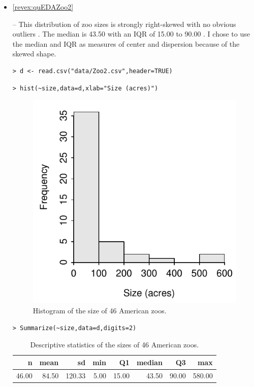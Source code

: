 \documentclass[10pt,openany]{book}\usepackage[]{graphicx}\usepackage[]{color}
\makeatletter
\newenvironment{kframe}{%
 \def\at@end@of@kframe{}%
 \ifinner\ifhmode%
  \def\at@end@of@kframe{\end{minipage}}%
  \begin{minipage}{\columnwidth}%
 \fi\fi%
 \def\FrameCommand##1{\hskip\@totalleftmargin \hskip-\fboxsep
 \colorbox{shadecolor}{##1}\hskip-\fboxsep
     \hskip-\linewidth \hskip-\@totalleftmargin \hskip\columnwidth}%
 \MakeFramed {\advance\hsize-\width
   \@totalleftmargin\z@ \linewidth\hsize
   \@setminipage}}%
 {\par\unskip\endMakeFramed%
 \at@end@of@kframe}
\newenvironment{knitrout}{}{} %
\makeatother
\begin{document}
\begin{itemize}
  \item \hypertarget{ans:quEDAZoo2}{\ref{revex:quEDAZoo2}} -- This distribution of zoo sizes is strongly right-skewed with no obvious outliers .  The median is 43.50 with an IQR of 15.00 to 90.00 .  I chose to use the median and IQR as measures of center and dispersion because of the skewed shape.
\begin{knitrout}
\color{fgcolor}\begin{kframe}
\begin{verbatim}
> d <- read.csv("data/Zoo2.csv",header=TRUE)
\end{verbatim}
\end{kframe}
\end{knitrout}
\begin{knitrout}
\color{fgcolor}\begin{kframe}
\begin{verbatim}
> hist(~size,data=d,xlab="Size (acres)")
\end{verbatim}
\end{kframe}\begin{figure}[hbtp]

{\centering \includegraphics[width=.4\linewidth]{Figs/ZooHist-1} 

}

\caption[Histogram of the size of 46 American zoos]{Histogram of the size of 46 American zoos.}\label{fig:ZooHist}
\end{figure}


\end{knitrout}
\begin{knitrout}
\color{fgcolor}\begin{kframe}
\begin{verbatim}
> Summarize(~size,data=d,digits=2)
\end{verbatim}
\end{kframe}
\end{knitrout}
\begin{table}[ht]
\centering
\caption{Descriptive statistics of the sizes of 46 American zoos.} 
\label{tab:ZooSum}
\begin{tabular}{rrrrrrrr}
  \hline
n & mean & sd & min & Q1 & median & Q3 & max \\ 
  \hline
46.00 & 84.50 & 120.33 & 5.00 & 15.00 & 43.50 & 90.00 & 580.00 \\ 
   \hline
\end{tabular}
\end{table}



\end{itemize}
\end{document}

